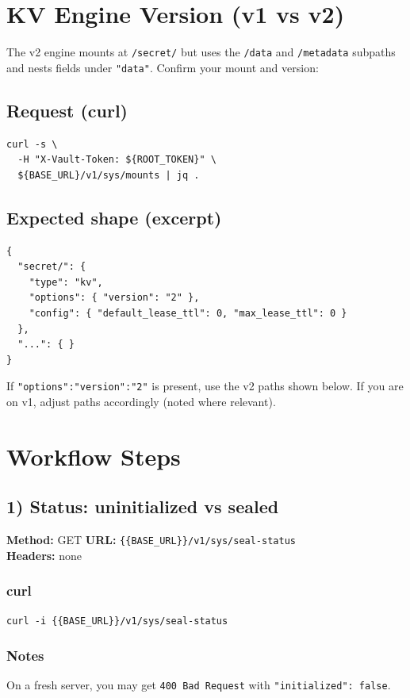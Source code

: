 \documentclass[11pt]{article}
\begin{document}
\section{KV Engine Version (v1 vs v2)}
The v2 engine mounts at \texttt{/secret/} but uses the \texttt{/data} and \texttt{/metadata} subpaths and nests fields under \texttt{"data"}.
Confirm your mount and version:
\subsection*{Request (curl)}
\begin{verbatim}
curl -s \
  -H "X-Vault-Token: ${ROOT_TOKEN}" \
  ${BASE_URL}/v1/sys/mounts | jq .
\end{verbatim}

\subsection*{Expected shape (excerpt)}
\begin{verbatim}
{
  "secret/": {
    "type": "kv",
    "options": { "version": "2" },
    "config": { "default_lease_ttl": 0, "max_lease_ttl": 0 }
  },
  "...": { }
}
\end{verbatim}

If \texttt{"options":{"version":"2"}} is present, use the v2 paths shown below. If you are on v1, adjust paths accordingly (noted where relevant).

\section{Workflow Steps}

\subsection{1) Status: uninitialized vs sealed}
\textbf{Method:} GET \quad \textbf{URL:} \texttt{\{\{BASE\_URL\}\}/v1/sys/seal-status} \\
\textbf{Headers:} none

\subsubsection*{curl}
\begin{verbatim}
curl -i {{BASE_URL}}/v1/sys/seal-status
\end{verbatim}

\subsubsection*{Notes}
On a fresh server, you may get \texttt{400 Bad Request} with \texttt{"initialized": false}.
\end{document}
